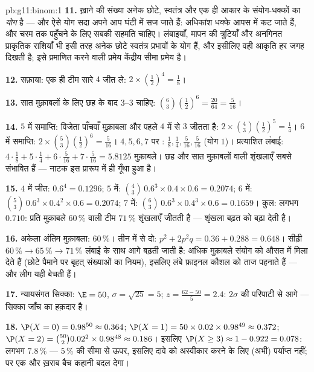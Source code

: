 \begin{solution}{pb:g11:binom:1}
\textbf{11.} ख़ाने की संख्या अनेक छोटे, स्वतंत्र और एक ही आकार के संयोग-धक्कों
का \emph{योग} है --- और ऐसे योग सदा अपने आप घंटी में सज जाते हैं: अधिकांश
धक्के आपस में कट जाते हैं, और चरम तक पहुँचने के लिए सबकी सहमति चाहिए।
लंबाइयाँ, मापन की त्रुटियाँ और अनगिनत प्राकृतिक राशियाँ भी इसी तरह अनेक छोटे
स्वतंत्र प्रभावों के योग हैं, और इसीलिए वही आकृति हर जगह दिखती है; इसे
प्रमाणित करने वाली प्रमेय केंद्रीय सीमा प्रमेय है।

\textbf{12.} सफ़ाया: एक ही टीम सारे $4$ जीत ले: $2 \times \left(\frac12\right)^4 = \frac18$।

\textbf{13.} सात मुक़ाबलों के लिए छह के बाद $3$--$3$ चाहिए: $\binom63 \left(\frac12\right)^6 = \frac{20}{64} =
\frac{5}{16}$।

\textbf{14.} $5$ में समाप्ति: विजेता पाँचवाँ मुक़ाबला और पहले $4$ में से
$3$ जीतता है: $2 \times \binom43 \left(\frac12\right)^5 = \frac14$। $6$ में समाप्ति: $2 \times \binom53 \left(\frac12\right)^6 = \frac{5}{16}$। $4, 5, 6, 7$ पर : $\frac18, \frac14, \frac{5}{16}, \frac{5}{16}$ (योग
$1$)। प्रत्याशित लंबाई: $4 \cdot \frac18 + 5 \cdot \frac14 + 6 \cdot
\frac{5}{16} + 7 \cdot \frac{5}{16} = 5.8125$ मुक़ाबले। छह और सात मुक़ाबलों वाली शृंखलाएँ
सबसे संभावित हैं --- नाटक इस प्रारूप में ही गूँथा हुआ है।

\textbf{15.} $4$ में जीत: $0.6^4 = 0.1296$; $5$ में: $\binom43\,0.6^3 \times 0.4 \times 0.6 = 0.2074$; $6$ में: $\binom53\,0.6^3 \times 0.4^2 \times 0.6 = 0.2074$; $7$
में: $\binom63\,0.6^3 \times 0.4^3 \times 0.6 = 0.1659$। कुल: लगभग $0.710$: प्रति मुक़ाबले $60\,\%$ वाली टीम $71\,\%$ शृंखलाएँ
जीतती है --- शृंखला बढ़त को बढ़ा देती है।

\textbf{16.} अकेला अंतिम मुक़ाबला: $60\,\%$। तीन में से दो: $p^2 + 2p^2 q = 0.36 + 0.288 = 0.648$। सीढ़ी $60\,\% \to 65\,\% \to 71\,\%$
लंबाई के साथ आगे बढ़ती जाती है: अधिक मुक़ाबले संयोग को औसत में मिला देते हैं
(छोटे पैमाने पर बृहत् संख्याओं का नियम), इसलिए लंबे फ़ाइनल कौशल को ताज
पहनाते हैं --- और लीग यही बेचती हैं।

\textbf{17.} न्यायसंगत सिक्का: $\E = 50$, $\sigma = \sqrt{25} = 5$; $z = \frac{62 - 50}{5} = 2.4$: $2\sigma$ की परिपाटी से आगे
--- सिक्का जाँच का हक़दार है।

\textbf{18.} $\P(X = 0) = 0.98^{50} \approx 0.364$; $\P(X = 1) = 50 \times 0.02 \times 0.98^{49} \approx 0.372$; $\P(X = 2) = \binom{50}{2} 0.02^2 \times 0.98^{48} \approx
0.186$। इसलिए $\P(X \geq 3) \approx 1 - 0.922 = 0.078$: लगभग $7.8\,\%$ --- $5\,\%$ की सीमा
से ऊपर, इसलिए दावे को अस्वीकार करने के लिए (अभी) पर्याप्त नहीं; पर एक और
ख़राब बैच कहानी बदल देगा।


\end{solution}
